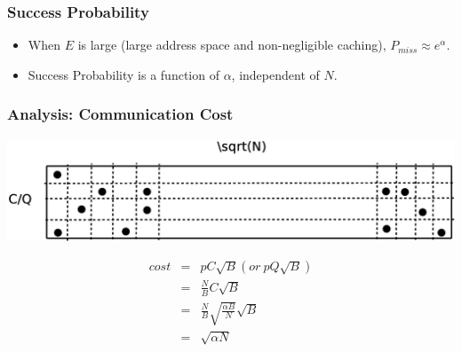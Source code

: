 \documentclass[red]{beamer}
\begin{document}
\begin{frame}
\frametitle{Success Probability}
\begin{itemize}
\item When $E$ is large (large address space and non-negligible caching),
$P_{miss} \approx e^{\alpha}$.
\item Success Probability is a function of $\alpha$, independent of $N$.
\end{itemize}
\end{frame}
\begin{frame}
\frametitle{Analysis: Communication Cost}
\center
\includegraphics[scale=0.25]{figs/cost_area}

\begin{eqnarray*}\label{th}
cost &=& pC\sqrt{B}  (or\  pQ\sqrt{B})\\
  &=& \frac{N}{B}C\sqrt{B}\\
  &=& \frac{N}{B}\sqrt{\frac{\alpha B}{N}}\sqrt{B}\\
  &=& \sqrt{\alpha N}
\end{eqnarray*}
\end{frame}
\end{document}
